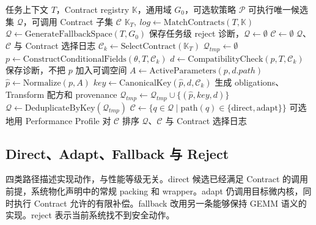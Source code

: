 \begin{algorithm}[!htbp]
  \caption{Contract 编译与执行路径生成}
  \label{alg:chapter4-contract-compile}
  \begin{algorithmic}[1]
    \Require 任务上下文 $T$，Contract registry $\mathbb{K}$，通用域 $G_0$，可选软策略 $\mathcal{P}$
    \Ensure 可执行唯一候选集 $\mathcal{Q}$，可调用 Contract 子集 $\mathcal{C}$
    \State $\mathbb{K}_T,\ log \gets \mathrm{MatchContracts}(T,\mathbb{K})$
        \State $\mathcal{Q}\gets\mathrm{GenerateFallbackSpace}(T,G_0)$
      \Else
        \State 保存任务级 reject 诊断，$\mathcal{Q}\gets\emptyset$
      \EndIf
      \State $\mathcal{C}\gets\emptyset$
      \State \Return $\mathcal{Q}$、$\mathcal{C}$ 与 Contract 选择日志
    \EndIf
    \State $\mathcal{C}_k\gets\mathrm{SelectContract}(\mathbb{K}_T)$
    \State $\mathcal{Q}_{tmp}\gets\emptyset$
      \State $p\gets\mathrm{ConstructConditionalFields}(\theta,T,\mathcal{C}_k)$
      \State $d\gets\mathrm{CompatibilityCheck}(p,T,\mathcal{C}_k)$
        \State 保存诊断，不把 $p$ 加入可调空间
      \Else
        \State $A\gets\mathrm{ActiveParameters}(p,d.path)$
        \State $\hat{p}\gets\mathrm{Normalize}(p,A)$
        \State $key\gets\mathrm{CanonicalKey}(\hat{p},d,\mathcal{C}_k)$
        \State 生成 obligations、Transform 配方和 provenance
        \State $\mathcal{Q}_{tmp}\gets\mathcal{Q}_{tmp}\cup\{(\hat{p},key,d)\}$
      \EndIf
    \EndFor
    \State $\mathcal{Q}\gets\mathrm{DeduplicateByKey}(\mathcal{Q}_{tmp})$
    \State $\mathcal{C}\gets\{q\in\mathcal{Q}\mid \mathrm{path}(q)\in\{\mathrm{direct},\mathrm{adapt}\}\}$
    \State 可选地用 Performance Profile 对 $\mathcal{C}$ 排序
    \State \Return $\mathcal{Q}$、$\mathcal{C}$ 与 Contract 选择日志
  \end{algorithmic}
\end{algorithm}

\subsection{Direct、Adapt、Fallback 与 Reject}

四类路径描述实现动作，与性能等级无关。direct 候选已经满足 Contract 的调用前提，系统物化声明中的常规 packing 和 wrapper。adapt 仍调用目标微内核，同时执行 Contract 允许的有限补偿。fallback 改用另一条能够保持 GEMM 语义的实现。reject 表示当前系统找不到安全动作。

